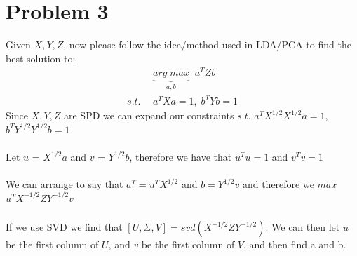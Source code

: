 \documentclass[11pt]{article}
\begin{document}
%

\section*{Problem 3}
Given $X, Y, Z$, now please follow the idea/method used in LDA/PCA to find the best solution to:
\begin{equation}
\begin{aligned}
&\underbrace{arg\;max}_{a,b}\;\;{a^TZb}\\
s.t. \ \ &a^TXa =1,\; b^TYb =1
\end{aligned}
\end{equation}
Since $X, Y, Z$ are SPD we can expand our constraints $s.t.$ $ a^TX^{1/2}X^{1/2}a = 1, $ $b^TY^{1/2}Y^{1/2}b = 1$\\\\
Let $u$ = $X^{1/2}a$ and $v$ = $Y^{1/2}b$, therefore we have that $u^Tu = 1$ and $v^Tv = 1$\\\\We can arrange to say that $a^T = u^TX^{1/2}$ and $b = Y^{1/2}v$ and therefore we $max$ $u^TX^{-1/2}ZY^{-1/2}v$\\\\If we use SVD we find that $[U, \Sigma, V] = svd(X^{-1/2}ZY^{-1/2})$. We can then let $u$ be the first column of $U$, and $v$ be the first column of $V$, and then find a and b.
\end{document}
